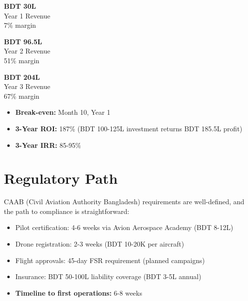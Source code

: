 \noindent
\begin{minipage}[t]{0.3\textwidth}
    \begin{tcolorbox}[colback=BoxBlue,colframe=SecondaryBlue,arc=4pt,boxrule=1pt,
        halign=center,top=6pt,bottom=6pt]
        {\large\bfseries\color{PrimaryBlue}BDT 30L}\\[2pt]
        {\small\color{DarkGrey}Year 1 Revenue\\7\% margin}
    \end{tcolorbox}
\end{minipage}\hfill
\begin{minipage}[t]{0.3\textwidth}
    \begin{tcolorbox}[colback=BoxBlue,colframe=SecondaryBlue,arc=4pt,boxrule=1pt,
        halign=center,top=6pt,bottom=6pt]
        {\large\bfseries\color{PrimaryBlue}BDT 96.5L}\\[2pt]
        {\small\color{DarkGrey}Year 2 Revenue\\51\% margin}
    \end{tcolorbox}
\end{minipage}\hfill
\begin{minipage}[t]{0.3\textwidth}
    \begin{tcolorbox}[colback=BoxGreen,colframe=AccentGreen,arc=4pt,boxrule=1pt,
        halign=center,top=6pt,bottom=6pt]
        {\large\bfseries\color{AccentGreen}BDT 204L}\\[2pt]
        {\small\color{DarkGrey}Year 3 Revenue\\67\% margin}
    \end{tcolorbox}
\end{minipage}

\begin{itemize}
    \item \textbf{Break-even:} Month 10, Year 1
    \item \textbf{3-Year ROI:} 187\% (BDT 100-125L investment returns BDT 185.5L profit)
    \item \textbf{3-Year IRR:} 85-95\%
\end{itemize}

\section*{Regulatory Path}

CAAB (Civil Aviation Authority Bangladesh) requirements are well-defined, and the path to compliance is straightforward:
\begin{itemize}
    \item Pilot certification: 4-6 weeks via Avion Aerospace Academy (BDT 8-12L)
    \item Drone registration: 2-3 weeks (BDT 10-20K per aircraft)
    \item Flight approvals: 45-day FSR requirement (planned campaigns)
    \item Insurance: BDT 50-100L liability coverage (BDT 3-5L annual)
    \item \textbf{Timeline to first operations:} 6-8 weeks
\end{itemize}

